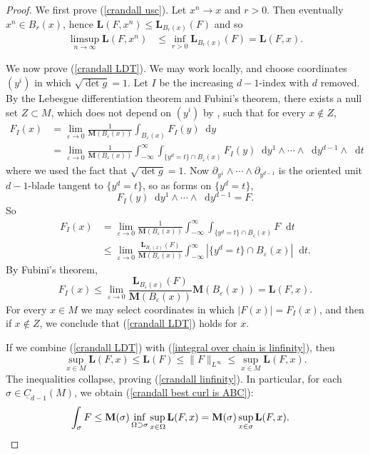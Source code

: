 \documentclass[reqno,11pt]{amsart}
\newcommand*\dif{\mathop{}\!\mathrm{d}}
\newcommand{\Chain}{\underline C}
\newcommand{\Mass}{\mathbf M}
\newcommand{\Comass}{\mathbf L}
\theoremstyle{definition}
\numberwithin{equation}{section}
\begin{document}
\begin{proof}
We first prove (\ref{crandall usc}).
Let $x^n \to x$ and $r > 0$. Then eventually $x^n \in B_r(x)$, hence $\Comass(F, x^n) \leq \Comass_{B_r(x)}(F)$ and so
\begin{align*}
\limsup_{n \to \infty} \Comass(F, x^n) &\leq \inf_{r > 0} \Comass_{B_r(x)}(F) = \Comass(F, x).
\end{align*}

We now prove (\ref{crandall LDT}).
We may work locally, and choose coordinates $(y^i)$ in which $\sqrt{\det g} = 1$.
Let $I$ be the increasing $d-1$-index with $d$ removed.
By the Lebesgue differentiation theorem and Fubini's theorem, there exists a null set $Z \subset M$, which does not depend on $(y^i)$ by \cite[Proposition 2.1]{BackusFLG}, such that for every $x \notin Z$,
\begin{align*}
F_I(x) 
&= \lim_{\varepsilon \to 0} \frac{1}{\Mass(B_\varepsilon(x))} \int_{B_\varepsilon(x)} F_I(y) \dif y \\
&= \lim_{\varepsilon \to 0} \frac{1}{\Mass(B_\varepsilon(x))} \int_{-\infty}^\infty \int_{\{y^d = t\} \cap B_\varepsilon(x)} F_I(y) \dif y^1 \wedge \cdots \wedge \dif y^{d - 1} \wedge \dif t
\end{align*}
where we used the fact that $\sqrt{\det g} = 1$.
Now $\partial_{y^1} \wedge \cdots \wedge \partial_{y^{d - 1}}$ is the oriented unit $d - 1$-blade tangent to $\{y^d = t\}$, so as forms on $\{y^d = t\}$,
$$F_I(y) \dif y^1 \wedge \cdots \wedge \dif y^{d - 1} = F.$$
So
\begin{align*}
F_I(x) 
&= \lim_{\varepsilon \to 0} \frac{1}{\Mass(B_\varepsilon(x))} \int_{-\infty}^\infty \int_{\{y^d = t\} \cap B_\varepsilon(x)} F \dif t \\
&\leq \lim_{\varepsilon \to 0} \frac{\Comass_{B_\varepsilon(x)}(F)}{\Mass(B_\varepsilon(x))} \int_{-\infty}^\infty |\{y^d = t\} \cap B_\varepsilon(x)| \dif t.
\end{align*}
By Fubini's theorem,
$$F_I(x) \leq \lim_{\varepsilon \to 0} \frac{\Comass_{B_\varepsilon(x)}(F)}{\Mass(B_\varepsilon(x))} \Mass(B_\varepsilon(x)) = \Comass(F, x).$$
For every $x \in M$ we may select coordinates in which $|F(x)| = F_I(x)$, and then if $x \notin Z$, we conclude that (\ref{crandall LDT}) holds for $x$.

If we combine (\ref{crandall LDT}) with (\ref{integral over chain is linfinity}), then
$$\sup_{x \in M} \Comass(F, x) \leq \Comass(F) \leq \|F\|_{L^\infty} \leq \sup_{x \in M} \Comass(F, x).$$
The inequalities collapse, proving (\ref{crandall linfinity}).
In particular, for each $\sigma \in \Chain_{d - 1}(M)$, we obtain (\ref{crandall best curl is ABC}):
\begin{align*}
\int_\sigma F &\leq \Mass(\sigma) \inf_{\Omega \supset \sigma} \sup_{x \in \Omega} \Comass(F, x) = \Mass(\sigma) \sup_{x \in \sigma} \Comass(F, x). \qedhere
\end{align*}
\end{proof}
\end{document}
